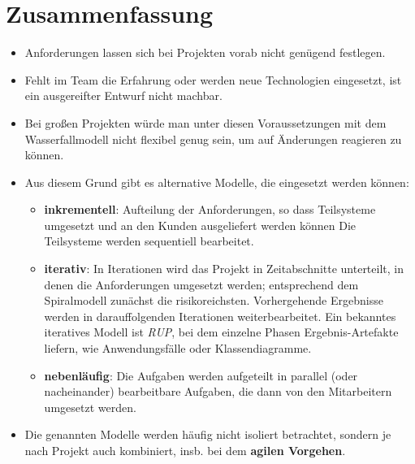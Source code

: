 \section{Zusammenfassung}

\begin{itemize}
    \item Anforderungen lassen sich bei Projekten vorab nicht genügend festlegen.
    \item Fehlt im Team die Erfahrung oder werden neue Technologien eingesetzt, ist ein ausgereifter Entwurf nicht machbar.
    \item Bei großen Projekten würde man unter diesen Voraussetzungen mit dem Wasserfallmodell nicht flexibel genug sein,
    um auf Änderungen reagieren zu können.
    \item Aus diesem Grund gibt es alternative Modelle, die eingesetzt werden können:
        \begin{itemize}
            \item \textbf{inkrementell}: Aufteilung der Anforderungen, so dass Teilsysteme umgesetzt und an den Kunden ausgeliefert werden können
            Die Teilsysteme werden sequentiell bearbeitet.
            \item \textbf{iterativ}: In Iterationen wird das Projekt in Zeitabschnitte unterteilt, in denen die Anforderungen umgesetzt werden; entsprechend dem Spiralmodell zunächst die risikoreichsten.
            Vorhergehende Ergebnisse werden in darauffolgenden Iterationen weiterbearbeitet.
            Ein bekanntes iteratives Modell ist \textit{RUP}, bei dem einzelne Phasen Ergebnis-Artefakte liefern, wie Anwendungsfälle oder Klassendiagramme.
            \item \textbf{nebenläufig}: Die Aufgaben werden aufgeteilt in parallel (oder nacheinander) bearbeitbare Aufgaben, die dann von den Mitarbeitern umgesetzt werden.
        \end{itemize}
    \item Die genannten Modelle werden häufig nicht isoliert betrachtet, sondern je nach Projekt auch kombiniert, insb. bei dem \textbf{agilen Vorgehen}.
\end{itemize}